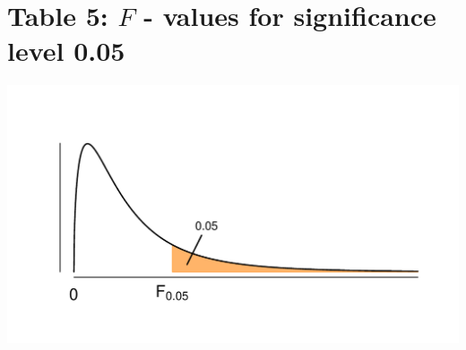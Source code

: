 \section{Table 5: $F$ - values for significance level 0.05}
\label{table5}

\vspace*{-30pt}
\begin{minipage}{0.6\textwidth}
\hfill
\end{minipage}
\begin{minipage}{0.4\textwidth}
\includegraphics[width=\textwidth]{Files/Images/fdist.pdf}
\end{minipage}

